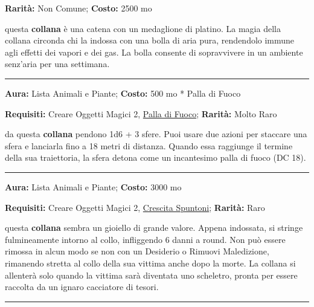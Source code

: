 \begin{multicols}{2}
\textbf{Rarità:} Non Comune; \textbf{Costo:} 2500 mo

questa \textbf{collana} è una catena con un medaglione di platino. La magia della collana circonda chi la indossa con una bolla di aria pura, rendendolo immune agli effetti dei vapori e dei gas. La bolla consente di sopravvivere in un ambiente senz'aria per una settimana.

\smallskip\noindent\rule{\linewidth}{2pt}  \hypertarget{CollanadellePallediFuoco}{}\smallskip{}\noindent\label{CollanadellePallediFuoco}

\textbf{Aura:} Lista Animali e Piante; \textbf{Costo:} 500 mo * Palla di Fuoco

\textbf{Requisiti:} Creare Oggetti Magici 2, \hyperlink{Palla di Fuoco}{Palla di Fuoco}; \textbf{Rarità:} Molto Raro

da questa \textbf{collana} pendono 1d6 + 3 sfere. Puoi usare due azioni per staccare una sfera e lanciarla fino a 18 metri di distanza. Quando essa raggiunge il termine della sua traiettoria, la sfera detona come un incantesimo palla di fuoco (DC 18).

\smallskip\noindent\rule{\linewidth}{2pt}  \hypertarget{CollanadelloStrangolamento}{}\smallskip{}\noindent\label{CollanadelloStrangolamento}

\textbf{Aura:} Lista Animali e Piante; \textbf{Costo:} 3000 mo

\textbf{Requisiti:} Creare Oggetti Magici 2, \hyperlink{Crescita Spuntoni}{Crescita Spuntoni}; \textbf{Rarità:} Raro

questa \textbf{collana} sembra un gioiello di grande valore. Appena indossata, si stringe fulmineamente intorno al collo, infliggendo 6 danni a round. Non può essere rimossa in alcun modo se non con un Desiderio o Rimuovi Maledizione, rimanendo stretta al collo della sua vittima anche dopo la morte. La collana si allenterà solo quando la vittima sarà diventata uno scheletro, pronta per essere raccolta da un ignaro cacciatore di tesori.

\smallskip\noindent\rule{\linewidth}{2pt}  \hypertarget{Coraggiosa}{}\smallskip{}\noindent\label{Coraggiosa}


\end{multicols}
